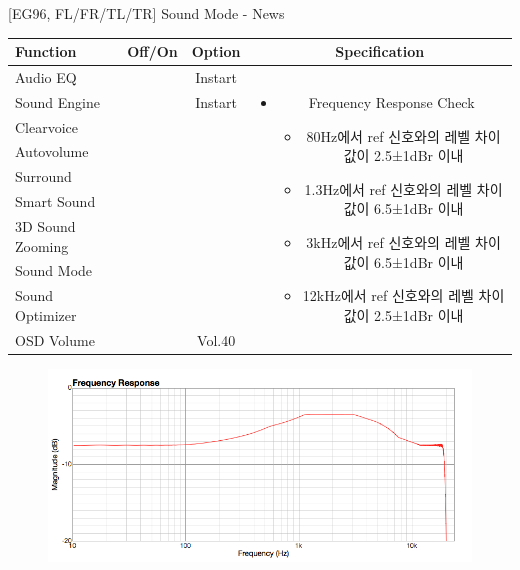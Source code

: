 \documentclass{beamer}
\begin{document}
\begin{frame}[t]{[EG96, FL/FR/TL/TR] Sound Mode - News}
\begin{tiny}
\begin{tabular}{@{}lccc@{}}
\toprule
Function & Off/On & Option & Specification \\
\midrule
Audio EQ & \color{black}{Off} & Instart &
\multirow{10}{60mm}{
\begin{itemize}
\item Frequency Response Check
	\begin{itemize}
	\item 80Hz에서 ref 신호와의 레벨 차이값이 2.5±1dBr 이내
	\item 1.3Hz에서 ref 신호와의 레벨 차이값이 6.5±1dBr 이내
	\item 3kHz에서 ref 신호와의 레벨 차이값이 6.5±1dBr 이내
	\item 12kHz에서 ref 신호와의 레벨 차이값이 2.5±1dBr 이내
	\end{itemize}
\end{itemize}
} \\
Sound Engine & \color{blue}{On} & Instart & \\
Clearvoice & \color{black}{Off} & & \\
Autovolume & \color{black}{Off} & & \\
Surround & \color{black}{Off} & & \\
Smart Sound & \color{black}{Off} & & \\
3D Sound Zooming & \color{black}{Off} & & \\
Sound Mode & \color{blue}{On} & \color{blue}{News} & \\
Sound Optimizer & \color{black}{Off} & & \\
OSD Volume & \color{blue}{On} & Vol.40 & \\
\midrule
\end{tabular}
\end{tiny}

\begin{figure}[b]
\includegraphics[height=0.4\textwidth]{figure/EG96/news.png}
\end{figure}

\end{frame}
\end{document}
